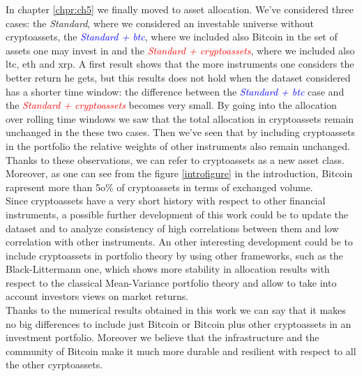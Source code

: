 \bigskip
In chapter \ref{chpr:ch5} we finally moved to asset allocation. We've considered three cases: the \textit{Standard}, where we considered an investable universe without cryptoassets, the \textit{\textcolor{blue}{Standard + btc}}, where we included also Bitcoin in the set of assets one may invest in and the \textit{\textcolor{red}{Standard + cryptoassets}}, where we included also ltc, eth and xrp. A first result shows that the more instruments one considers the better return he gets, but this results does not hold when the dataset considered has a shorter time window: the difference between the \textit{\textcolor{blue}{Standard + btc}} case and the \textit{\textcolor{red}{Standard + cryptoassets}} becomes very small. By going into the allocation over rolling time windows we saw that the total allocation in cryptoassets remain unchanged in the these two cases. Then we've seen that by including cryptoassets in the portfolio the relative weights of other instruments also remain unchanged. Thanks to these observations, we can refer to cryptoassets as a new asset class.\\
Moreover, as one can see from the figure \ref{introfigure} in the introduction, Bitcoin rapresent more than 5o\% of cryptoassets in terms of exchanged volume.\\


Since cryptoassets have a very short history with respect to other financial instruments, a possible further development of this work could be to update the dataset and to analyze consistency of high correlations between them and low correlation with other instruments. An other interesting development could be to include cryptoassets in portfolio theory by using other frameworks, such as the Black-Littermann one, which shows more stability in allocation results with respect to the classical Mean-Variance portfolio theory and allow to take into account investors views on market returns.\\

Thanks to the numerical results obtained in this work we can say that it makes no big differences to include just Bitcoin or Bitcoin plus other cryptoassets in an investment portfolio. Moreover we believe that the infrastructure and the community of Bitcoin make it much more durable and resilient with respect to all the other cyrptoassets.
